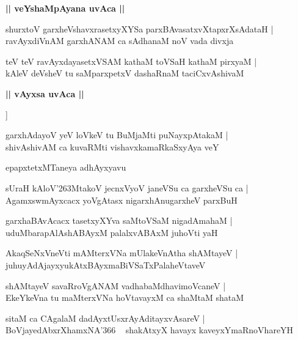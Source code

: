 \documentclass[twoside,12pt,openright]{book}
\def\S{\char'263}
\newcounter{shloka}[chapter]
\def\uvaca#1{\centerline{{\large\textbf{#1}}}}
\begin{document}
\uvaca{|| veYshaMpAyana uvAca ||}

\begin{shloka}%
shurxtoV garxheVshavxrasetxyXYSa parxBAvasatxvXtapxrXsAdataH |\\
ravAyxdiVnAM garxhANAM ca sAdhanaM noV vada divxja
\end{shloka}

\begin{shloka}%
teV teV ravAyxdayasetxVSAM kathaM toVSaH kathaM pirxyaM |\\
kAleV deVsheV tu saMparxpetxV dashaRnaM taciCxvAshivaM 
\end{shloka}

\uvaca{|| vAyxsa uvAca ||}]

\begin{shloka}%
garxhAdayoV yeV loVkeV tu BuMjaMti puNayxpAtakaM |\\
shivAshivAM ca kuvaRMti vishavxkamaRkaSxyAya veY
\end{shloka}

\begin{center}
epapxtetxMTaneya adhAyxyavu
\end{center}

\begin{shloka}%
sUraH kAloV\S MtakoV jecnxVyoV janeVSu ca garxheVSu ca |\\
AgamxswmAyxcacx yoVgAtasx nigarxhAnugarxheV parxBuH 
\end{shloka}

\begin{shloka}%
garxhaBAvAcacx tasetxyXYva saMtoVSaM nigadAmahaM |\\
uduMbarapAlAshABAyxM palalxvABAxM juhoVti yaH 
\end{shloka}

\begin{shloka}%
AkaqSeNxVneVti mAMterxVNa mUlakeVnAtha shAMtayeV |\\
juhuyAdAjayxyukAtxBAyxmaBiVSaTxPalaheVtaveV 
\end{shloka}

\begin{shloka}%
shAMtayeV savaRroVgANAM vadhabaMdhavimoVcaneV |\\
EkeYkeVna tu maMterxVNa hoVtavayxM ca shaMtaM shataM 
\end{shloka}

\begin{shloka}%
sitaM ca CAgalaM dadAyxtUsxrAyAditayxvAsareV |\\
BoVjayedAbxrXhamxNA\char'366 ~ shakAtxyX havayx kaveyxYmaRnoVhareYH
\end{shloka}
\end{document}
